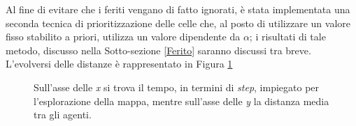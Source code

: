 Al fine di evitare che i feriti vengano di fatto ignorati, è stata implementata una seconda tecnica di prioritizzazione delle celle che, al posto di utilizzare un valore fisso stabilito a priori, utilizza un valore dipendente da $\alpha$; i risultati di tale metodo, discusso nella Sotto-sezione \ref{Ferito} saranno discussi tra breve.
L'evolversi delle distanze è rappresentato in Figura \ref{fig:gammaHSim}
\begin{figure}
	\hfill
	\caption{Sull'asse delle \textit{x} si trova il tempo, in termini di \textit{step}, impiegato per l'esplorazione della mappa, mentre sull'asse delle \textit{y} la distanza media tra gli agenti.}
	\label{fig:gammaHSim}
\end{figure}
